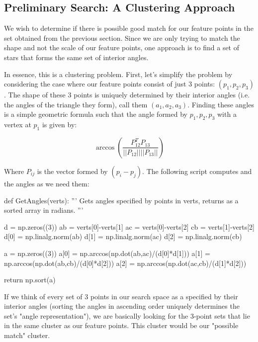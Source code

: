 \documentclass[paper=a4, fontsize=11pt]{scrartcl} %
\begin{document}
\subsection{Preliminary Search: A Clustering Approach}
We wish to determine if there is possible good match for our feature points in the set obtained from the previous section.  Since we are only trying to match the shape and not the scale of our feature points, one approach is to find a set of stars that forms the same set of interior angles.

In essence, this is a clustering problem. First, let's simplify the problem by considering the case where our feature points consist of just 3 points: $(p_1,p_2,p_3)$. The shape of these 3 points is uniquely determined by their interior angles (i.e. the angles of the triangle they form), call them $(a_1,a_2,a_3)$. Finding these angles is a simple geometric formula such that the angle formed by $p_1, p_2, p_3$ with a vertex at $p_1$ is given by:

$$\arccos\left(\frac{P_{12}^TP_{13}}{||P_{12}||||P_{13}||}\right)$$

Where $P_{ij}$ is the vector formed by $(p_i - p_j)$.
The following script computes and the angles as we need them:

\begin{python}
def GetAngles(verts):
    '''
    Gets angles specified by points in verts,
    returns as a sorted array in radians.
    '''
    
    d = np.zeros((3))
    ab = verts[0]-verts[1]
    ac = verts[0]-verts[2]
    cb = verts[1]-verts[2]
    d[0] = np.linalg.norm(ab)
    d[1] = np.linalg.norm(ac)
    d[2] = np.linalg.norm(cb)
    
    a = np.zeros((3))
    a[0] = np.arccos(np.dot(ab,ac)/(d[0]*d[1]))
    a[1] = np.arccos(np.dot(ab,cb)/(d[0]*d[2]))
    a[2] = np.arccos(np.dot(ac,cb)/(d[1]*d[2]))
    
    return np.sort(a)
\end{python}

If we think of every set of 3 points in our search space as a specified by their interior angles (sorting the angles in ascending order uniquely determines the set's "angle representation"), we are basically looking for the 3-point sets that lie in the same cluster as our feature points. This cluster would be our "possible match" cluster.

\end{document}
